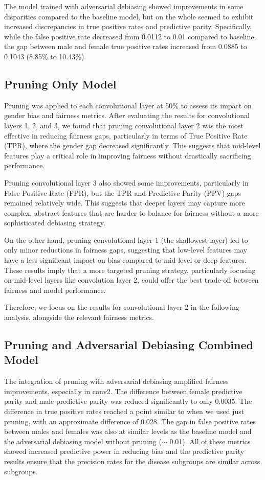 \documentclass[11pt]{article}
\begin{document}
The model trained with adversarial debiasing showed improvements in some disparities compared to the baseline model, but on the whole seemed to exhibit increased discrepancies in true positive rates and predictive parity. Specifically, while the false positive rate decreased from 0.0112 to 0.01 compared to baseline, the gap between male and female true positive rates increased from 0.0885 to 0.1043 (8.85\% to 10.43\%).

\subsection{Pruning Only Model}

Pruning was applied to each convolutional layer at 50\% to assess its impact on gender bias and fairness metrics. After evaluating the results for convolutional layers 1, 2, and 3, we found that pruning convolutional layer 2 was the most effective in reducing fairness gaps, particularly in terms of True Positive Rate (TPR), where the gender gap decreased significantly. This suggests that mid-level features play a critical role in improving fairness without drastically sacrificing performance.

Pruning convolutional layer 3 also showed some improvements, particularly in False Positive Rate (FPR), but the TPR and Predictive Parity (PPV) gaps remained relatively wide. This suggests that deeper layers may capture more complex, abstract features that are harder to balance for fairness without a more sophisticated debiasing strategy.

On the other hand, pruning convolutional layer 1 (the shallowest layer) led to only minor reductions in fairness gaps, suggesting that low-level features may have a less significant impact on bias compared to mid-level or deep features. These results imply that a more targeted pruning strategy, particularly focusing on mid-level layers like convolution layer 2, could offer the best trade-off between fairness and model performance.

Therefore, we focus on the results for convolutional layer 2 in the following analysis, alongside the relevant fairness metrics.

\subsection{Pruning and Adversarial Debiasing Combined Model}

The integration of pruning with adversarial debiasing amplified fairness improvements, especially in conv2. The difference between female predictive parity and male predictive parity was reduced significantly to only 0.0035. The difference in true positive rates reached a point similar to when we used just pruning, with an approximate difference of 0.028. The gap in false positive rates between males and females was also at similar levels as the baseline model and the adversarial debiasing model without pruning (${\sim}$ 0.01). All of these metrics showed increased predictive power in reducing bias and the predictive parity results ensure that the precision rates for the disease subgroups are similar across subgroups.
\end{document}
